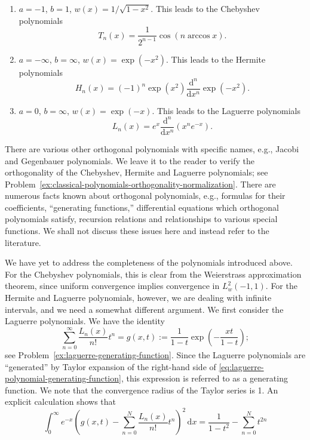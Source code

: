 \begin{enumerate}
\item $a=-1$, $b=1$, $w(x)=1/\sqrt{1-x^2}$. This leads to the Chebyshev polynomials
\begin{equation}\label{eq:chebyshev-polynomial-cosine-formula}
T_n(x)=\dfrac1{2^{n-1}}\cos(n\arccos x).
\end{equation}

\item $a=-\infty$, $b=\infty$, $w(x)=\exp(-x^2)$. This leads to the Hermite polynomials
\begin{equation}\label{eq:hermite-polynomial-rodrigues-formula}
H_n(x)=(-1)^n\exp(x^2)\dfrac{\mathrm{d}^n}{\mathrm{d}x^n}\exp(-x^2).
\end{equation}

\item $a=0$, $b=\infty$, $w(x)=\exp(-x)$. This leads to the Laguerre polynomials
\begin{equation}\label{eq:laguerre-polynomial-rodrigues-formula}
L_n(x)=e^x\dfrac{\mathrm{d}^n}{\mathrm{d}x^n}(x^ne^{-x}).
\end{equation}
\end{enumerate}

There are various other orthogonal polynomials with specific names, e.g., Jacobi and Gegenbauer polynomials. We leave it to the reader to verify the orthogonality of the Chebyshev, Hermite and Laguerre polynomials; see Problem~\ref{ex:classical-polynomials-orthogonality-normalization}. There are numerous facts known about orthogonal polynomials, e.g., formulas for their coefficients, ``generating functions,'' differential equations which orthogonal polynomials satisfy, recursion relations and relationships to various special functions. We shall not discuss these issues here and instead refer to the literature.

We have yet to address the completeness of the polynomials introduced above. For the Chebyshev polynomials, this is clear from the Weierstrass approximation theorem, since uniform convergence implies convergence in $L_w^2(-1,1)$. For the Hermite and Laguerre polynomials, however, we are dealing with infinite intervals, and we need a somewhat different argument. We first consider the Laguerre polynomials. We have the identity
\begin{equation}\label{eq:laguerre-polynomial-generating-function}
\sum_{n=0}^\infty\dfrac{L_n(x)}{n!}t^n=g(x,t):=\dfrac1{1-t}\exp\left(-\dfrac{xt}{1-t}\right);
\end{equation}
see Problem~\ref{ex:laguerre-generating-function}. Since the Laguerre polynomials are ``generated'' by Taylor expansion of the right-hand side of \eqref{eq:laguerre-polynomial-generating-function}, this expression is referred to as a generating function. We note that the convergence radius of the Taylor series is 1. An explicit calculation shows that
\begin{equation}\label{eq:laguerre-generating-function-lp-two-remainder}
\int_0^\infty e^{-x}\left(g(x,t)-\sum_{n=0}^N\dfrac{L_n(x)}{n!}t^n\right)^2\,\mathrm{d}x=\dfrac1{1-t^2}-\sum_{n=0}^N t^{2n}
\end{equation}


